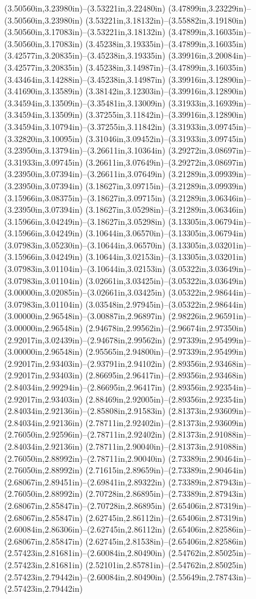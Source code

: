 (3.50560in,3.23980in)--(3.53221in,3.22480in) (3.47899in,3.23229in)--(3.50560in,3.23980in) (3.53221in,3.18132in)--(3.55882in,3.19180in) (3.50560in,3.17083in)--(3.53221in,3.18132in) (3.47899in,3.16035in)--(3.50560in,3.17083in) (3.45238in,3.19335in)--(3.47899in,3.16035in) (3.42577in,3.20835in)--(3.45238in,3.19335in) (3.39916in,3.20084in)--(3.42577in,3.20835in) (3.45238in,3.14987in)--(3.47899in,3.16035in) (3.43464in,3.14288in)--(3.45238in,3.14987in) (3.39916in,3.12890in)--(3.41690in,3.13589in) (3.38142in,3.12303in)--(3.39916in,3.12890in) (3.34594in,3.13509in)--(3.35481in,3.13009in) (3.31933in,3.16939in)--(3.34594in,3.13509in) (3.37255in,3.11842in)--(3.39916in,3.12890in) (3.34594in,3.10794in)--(3.37255in,3.11842in) (3.31933in,3.09745in)--(3.32820in,3.10095in) (3.31046in,3.09452in)--(3.31933in,3.09745in) (3.23950in,3.13794in)--(3.26611in,3.10364in) (3.29272in,3.08697in)--(3.31933in,3.09745in) (3.26611in,3.07649in)--(3.29272in,3.08697in) (3.23950in,3.07394in)--(3.26611in,3.07649in) (3.21289in,3.09939in)--(3.23950in,3.07394in) (3.18627in,3.09715in)--(3.21289in,3.09939in) (3.15966in,3.08375in)--(3.18627in,3.09715in) (3.21289in,3.06346in)--(3.23950in,3.07394in) (3.18627in,3.05298in)--(3.21289in,3.06346in) (3.15966in,3.04249in)--(3.18627in,3.05298in) (3.13305in,3.06794in)--(3.15966in,3.04249in) (3.10644in,3.06570in)--(3.13305in,3.06794in) (3.07983in,3.05230in)--(3.10644in,3.06570in) (3.13305in,3.03201in)--(3.15966in,3.04249in) (3.10644in,3.02153in)--(3.13305in,3.03201in) (3.07983in,3.01104in)--(3.10644in,3.02153in) (3.05322in,3.03649in)--(3.07983in,3.01104in) (3.02661in,3.03425in)--(3.05322in,3.03649in) (3.00000in,3.02085in)--(3.02661in,3.03425in) (3.05322in,2.98644in)--(3.07983in,3.01104in) (3.03548in,2.97945in)--(3.05322in,2.98644in) (3.00000in,2.96548in)--(3.00887in,2.96897in) (2.98226in,2.96591in)--(3.00000in,2.96548in) (2.94678in,2.99562in)--(2.96674in,2.97350in) (2.92017in,3.02439in)--(2.94678in,2.99562in) (2.97339in,2.95499in)--(3.00000in,2.96548in) (2.95565in,2.94800in)--(2.97339in,2.95499in) (2.92017in,2.93403in)--(2.93791in,2.94102in) (2.89356in,2.93468in)--(2.92017in,2.93403in) (2.86695in,2.96417in)--(2.89356in,2.93468in) (2.84034in,2.99294in)--(2.86695in,2.96417in) (2.89356in,2.92354in)--(2.92017in,2.93403in) (2.88469in,2.92005in)--(2.89356in,2.92354in) (2.84034in,2.92136in)--(2.85808in,2.91583in) (2.81373in,2.93609in)--(2.84034in,2.92136in) (2.78711in,2.92402in)--(2.81373in,2.93609in) (2.76050in,2.92596in)--(2.78711in,2.92402in) (2.81373in,2.91088in)--(2.84034in,2.92136in) (2.78711in,2.90040in)--(2.81373in,2.91088in) (2.76050in,2.88992in)--(2.78711in,2.90040in) (2.73389in,2.90464in)--(2.76050in,2.88992in) (2.71615in,2.89659in)--(2.73389in,2.90464in) (2.68067in,2.89451in)--(2.69841in,2.89322in) (2.73389in,2.87943in)--(2.76050in,2.88992in) (2.70728in,2.86895in)--(2.73389in,2.87943in) (2.68067in,2.85847in)--(2.70728in,2.86895in) (2.65406in,2.87319in)--(2.68067in,2.85847in) (2.62745in,2.86112in)--(2.65406in,2.87319in) (2.60084in,2.86306in)--(2.62745in,2.86112in) (2.65406in,2.82586in)--(2.68067in,2.85847in) (2.62745in,2.81538in)--(2.65406in,2.82586in) (2.57423in,2.81681in)--(2.60084in,2.80490in) (2.54762in,2.85025in)--(2.57423in,2.81681in) (2.52101in,2.85781in)--(2.54762in,2.85025in) (2.57423in,2.79442in)--(2.60084in,2.80490in) (2.55649in,2.78743in)--(2.57423in,2.79442in) 